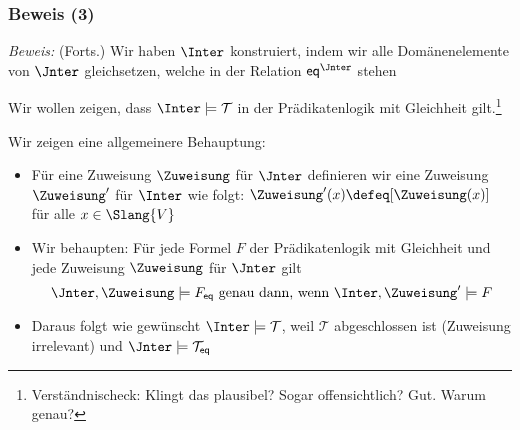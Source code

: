\documentclass[aspectratio=1610,onlymath]{beamer}
\begin{document}
\begin{frame}[t]\frametitle{Beweis (3)}

% 

\emph{Beweis:} {\footnotesize(Forts.)}
Wir haben $\Inter$ konstruiert, indem wir alle Domänenelemente von $\Jnter$
gleichsetzen, welche in der Relation $\eqpred^\Jnter$ stehen
\medskip

Wir wollen zeigen, dass $\Inter\models\mathcal{T}$ in der Prädikatenlogik mit Gleichheit gilt.\footnote{\tiny Verständnischeck: Klingt das plausibel? Sogar offensichtlich? Gut. Warum genau?}\pause\medskip

\alert{Wir zeigen eine allgemeinere Behauptung:}
\begin{itemize}
\item Für eine Zuweisung $\Zuweisung$ für $\Jnter$ definieren wir eine Zuweisung $\Zuweisung'$ für $\Inter$ wie folgt: $\Zuweisung'(x)\defeq[\Zuweisung(x)]$ für alle $x\in\Slang{V}$
\item Wir behaupten: Für jede Formel $F$ der Prädikatenlogik mit Gleichheit und jede Zuweisung $\Zuweisung$ für $\Jnter$ gilt
\[ \Jnter,\Zuweisung\models F_{\eqpred} \text{ genau dann, wenn } \Inter,\Zuweisung'\models F \]
\item Daraus folgt wie gewünscht $\Inter\models\mathcal{T}$, weil $\mathcal{T}$ abgeschlossen ist (Zuweisung irrelevant) und $\Jnter\models\mathcal{T}_{\eqpred}$
% 
\end{itemize}


\end{frame}
\end{document}
